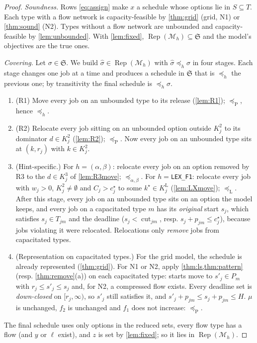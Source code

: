 \documentclass[11pt,a4paper]{article}
\newcommand{\Sched}{\mathfrak{S}}
\newcommand{\Rep}{\operatorname{Rep}}
\newcommand{\Cut}{\operatorname{cut}}
\newcommand{\code}[1]{\texttt{#1}}
\newcommand{\preceqP}{\preceq_{\mathrm{P}}}
\newcommand{\preceqW}{\preceq_{\alpha,\beta}}
\newcommand{\preceqL}{\preceq_{\mathrm{L}}}
\begin{document}
\begin{proof}
\emph{Soundness.} Rows \eqref{eq:assign} make $x$ a schedule whose options lie
in $S\subseteq T$. Each type with a flow network is capacity-feasible by
\cref{thm:grid} (grid, N1) or \cref{thm:sound} (N2). Types without a flow
network are unbounded and capacity-feasible by \cref{lem:unbounded}. With
\cref{lem:fixed}, $\Rep(\mathcal M_h)\subseteq\Sched$ and the model's
objectives are the true ones.

\emph{Covering.} Let $\sigma\in\Sched$. We build $\hat\sigma\in\Rep(\mathcal M_h)$
with $\hat\sigma\preceq_h\sigma$ in four stages. Each stage changes one job at a
time and produces a schedule in $\Sched$ that is $\preceq_h$ the previous
one; by transitivity the final schedule is $\preceq_h\sigma$.
\begin{enumerate}[label=\textbf{Stage \arabic*.},leftmargin=*]
\item (R1) Move every job on an unbounded type to its release
  (\cref{lem:R1}); $\preceqP$, hence $\preceq_h$.
\item (R2) Relocate every job sitting on an unbounded option outside
  $K^2_j$ to its dominator $d\in K^2_j$ (\cref{lem:R2}); $\preceqP$. Now every
  job on an unbounded type sits at $(k,r_j)$ with $k\in K^2_j$.
\item (Hint-specific.) For $h=(\alpha,\beta)$: relocate every job on an
  option removed by R3 to the $d\in K^3_j$ of \cref{lem:R3move};
  $\preceqW$. For $h=$\code{LEX\_F1}: relocate every job with $w_j>0$,
  $K^2_j\ne\emptyset$ and $C_j>c^\star_j$ to some $k^\star\in K^{\mathrm L}_j$
  (\cref{lem:LXmove}); $\preceqL$. After this stage, every job on an
  unbounded type sits on an option the model keeps, and every job on a
  capacitated type $m$ has its \emph{original} start $s_j$, which satisfies
  $s_j\in T_{jm}$ and the deadline ($s_j<\Cut_{jm}$, resp.
  $s_j+p_{jm}\le c^\star_j$), because jobs violating it were relocated.
  Relocations only \emph{remove} jobs from capacitated types.
\item (Representation on capacitated types.) For the grid model, the
  schedule is already represented (\cref{thm:grid}). For N1 or N2, apply
  \cref{thm:ls,thm:pattern} (resp. \cref{thm:remove}(a)) on each
  capacitated type: starts move to $s'_j\in P_m$ with $r_j\le s'_j\le s_j$
  and, for N2, a compressed flow exists. Every deadline set is
  \emph{down-closed} on $[r_j,\infty)$, so $s'_j$ still satisfies it, and
  $s'_j+p_{jm}\le s_j+p_{jm}\le H$. $\mu$ is unchanged, $f_2$ is unchanged and
  $f_1$ does not increase: $\preceqP$.
\end{enumerate}
The final schedule uses only options in the reduced sets, every flow type has
a flow (and $y$ or $\ell$ exist), and $z$ is set by \cref{lem:fixed}; so it
lies in $\Rep(\mathcal M_h)$.
\end{proof}
\end{document}
